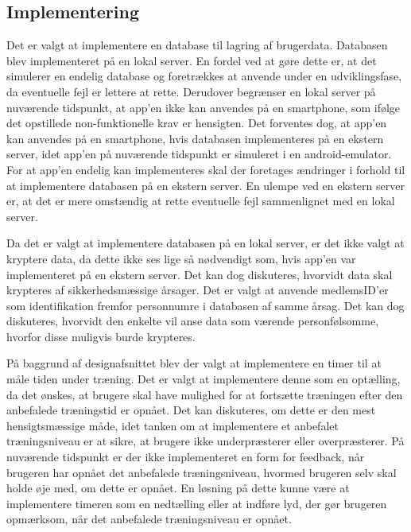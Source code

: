 \subsection{Implementering}
Det er valgt at implementere en database til lagring af brugerdata. Databasen blev 
implementeret på en lokal server. En fordel ved at gøre dette er, at det simulerer en endelig database og foretrækkes at anvende under en udviklingsfase, da eventuelle fejl er lettere at rette. Derudover begrænser en lokal server på nuværende tidspunkt, at app’en ikke kan anvendes på en smartphone, som ifølge det opstillede non-funktionelle krav er hensigten. Det forventes dog, at app'en kan anvendes på en smartphone, hvis databasen implementeres på en ekstern server, idet app’en på nuværende tidspunkt er simuleret i en android-emulator. For at app’en endelig kan implementeres skal der foretages ændringer i forhold til at  implementere databasen på en ekstern server.
En ulempe ved en ekstern server er, at det er mere omstændig at rette eventuelle fejl sammenlignet med en lokal server. 

Da det er valgt at implementere databasen på en lokal server, er det ikke valgt at kryptere data, da dette ikke ses lige så nødvendigt som, hvis app’en var implementeret på en ekstern server. Det kan dog diskuteres, hvorvidt data skal krypteres af sikkerhedsmæssige årsager. Det er valgt at anvende medlemsID’er som identifikation fremfor personnumre i databasen af samme årsag. Det kan dog diskuteres, hvorvidt den enkelte vil anse data som værende personfølsomme, hvorfor disse muligvis burde krypteres. 

På baggrund af designafsnittet blev der valgt at implementere en timer til at måle tiden under træning. Det er valgt at implementere denne som en optælling, da det ønskes, at brugere skal have mulighed for at fortsætte træningen efter den anbefalede træningstid er opnået. Det kan diskuteres, om dette er den mest hensigtsmæssige måde, idet tanken om at implementere et anbefalet træningsniveau er at sikre, at brugere ikke underpræsterer eller overpræsterer. På nuværende tidspunkt er der ikke implementeret en form for feedback, når brugeren har opnået det anbefalede træningsniveau, hvormed brugeren selv skal holde øje med, om dette er opnået. En løsning på dette kunne være at implementere timeren som en nedtælling eller at indføre lyd, der gør brugeren opmærksom, når det anbefalede træningsniveau er opnået. 